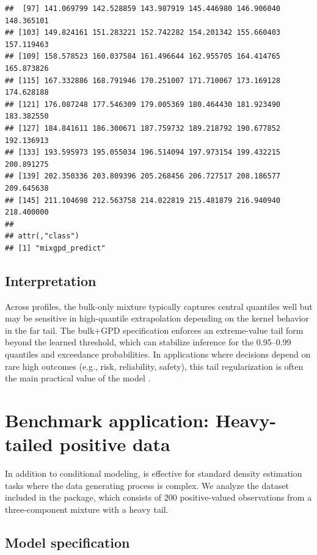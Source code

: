 \documentclass[article]{jss}\usepackage[]{graphicx}\usepackage[]{xcolor}
\makeatletter
\newenvironment{kframe}{%
 \def\at@end@of@kframe{}%
 \ifinner\ifhmode%
  \def\at@end@of@kframe{\end{minipage}}%
  \begin{minipage}{\columnwidth}%
 \fi\fi%
 \def\FrameCommand##1{\hskip\@totalleftmargin \hskip-\fboxsep
 \colorbox{shadecolor}{##1}\hskip-\fboxsep
     \hskip-\linewidth \hskip-\@totalleftmargin \hskip\columnwidth}%
 \MakeFramed {\advance\hsize-\width
   \@totalleftmargin\z@ \linewidth\hsize
   \@setminipage}}%
 {\par\unskip\endMakeFramed%
 \at@end@of@kframe}
\newenvironment{knitrout}{}{} %
\makeatother
\begin{document}
\begin{knitrout}
\begin{kframe}
\begin{verbatim}
##  [97] 141.069799 142.528859 143.987919 145.446980 146.906040 148.365101
## [103] 149.824161 151.283221 152.742282 154.201342 155.660403 157.119463
## [109] 158.578523 160.037584 161.496644 162.955705 164.414765 165.873826
## [115] 167.332886 168.791946 170.251007 171.710067 173.169128 174.628188
## [121] 176.087248 177.546309 179.005369 180.464430 181.923490 183.382550
## [127] 184.841611 186.300671 187.759732 189.218792 190.677852 192.136913
## [133] 193.595973 195.055034 196.514094 197.973154 199.432215 200.891275
## [139] 202.350336 203.809396 205.268456 206.727517 208.186577 209.645638
## [145] 211.104698 212.563758 214.022819 215.481879 216.940940 218.400000
## 
## attr(,"class")
## [1] "mixgpd_predict"
\end{verbatim}
\end{kframe}
\end{knitrout}

\subsection{Interpretation}

Across profiles, the bulk-only mixture typically captures central quantiles well but may be sensitive in high-quantile extrapolation depending on the kernel behavior in the far tail.
The bulk+GPD specification enforces an extreme-value tail form beyond the learned threshold, which can stabilize inference for the 0.95--0.99 quantiles and exceedance probabilities.
In applications where decisions depend on rare high outcomes (e.g., risk, reliability, safety), this tail regularization is often the main practical value of the model \citep{Pickands1975, DeHaanFerreira2006}.

\section{Benchmark application: Heavy-tailed positive data}

In addition to conditional modeling,  is effective for standard density estimation tasks where the data generating process is complex. We analyze the  dataset included in the package, which consists of 200 positive-valued observations from a three-component mixture with a heavy tail.

\subsection{Model specification}
\end{document}
